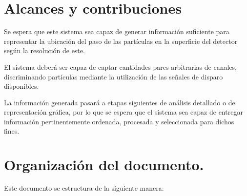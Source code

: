 	

\section{Alcances y contribuciones}
	\par Se espera que este sistema sea capaz de generar información suficiente para representar la ubicación del paso de las partículas en la superficie del detector según la resolución de este.
	\par El sistema deberá ser capaz de captar cantidades pares arbitrarias de canales, discriminando partículas mediante la utilización de las señales de disparo disponibles.
	\par La información generada pasará a etapas siguientes de análisis detallado o de representación gráfica, por lo que se espera que el sistema sea capaz de entregar información pertinentemente ordenada, procesada y seleccionada para dichos fines.\\
	 

\section{Organización del documento.}

	Este documento se estructura de la siguiente manera:
	
